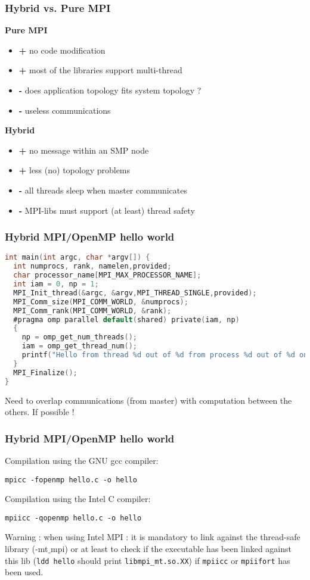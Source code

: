 \begin{frame}[containsverbatim]
	\frametitle{Hybrid vs. Pure MPI}	
\textbf{Pure MPI}
\begin{itemize}
	\item {\textbf{+} no code modification}
	\item {\textbf{+} most of the libraries support multi-thread}
	\item {\textbf{-} does application topology fits system topology ?}
	\item {\textbf{-} useless communications}
\end{itemize}
\textbf{Hybrid}
\begin{itemize}
	\item {\textbf{+} no message within an SMP node}
	\item {\textbf{+} less (no) topology problems}
	\item {\textbf{-} all threads sleep when master communicates}
	\item {\textbf{-} MPI-libs must support (at least) thread safety}
\end{itemize}
\end{frame}


\begin{frame}[containsverbatim]
\frametitle{Hybrid MPI/OpenMP hello world}
\begin{lstlisting}[language=C,frame=lines]
int main(int argc, char *argv[]) {
  int numprocs, rank, namelen,provided;
  char processor_name[MPI_MAX_PROCESSOR_NAME];
  int iam = 0, np = 1;
  MPI_Init_thread(&argc, &argv,MPI_THREAD_SINGLE,provided);
  MPI_Comm_size(MPI_COMM_WORLD, &numprocs);
  MPI_Comm_rank(MPI_COMM_WORLD, &rank);
  #pragma omp parallel default(shared) private(iam, np)
  {
    np = omp_get_num_threads();
    iam = omp_get_thread_num();
    printf("Hello from thread %d out of %d from process %d out of %d on\n",iam, np, rank, numprocs);
  }
  MPI_Finalize();
}
\end{lstlisting}

Need to overlap communications (from master) with computation between the others. If possible !

\end{frame}



\begin{frame}[containsverbatim]
\frametitle{Hybrid MPI/OpenMP hello world}

  Compilation using the GNU gcc compiler:
\begin{verbatim}
mpicc -fopenmp hello.c -o hello
\end{verbatim}
  Compilation using the Intel C compiler:

\begin{verbatim}
mpiicc -qopenmp hello.c -o hello
\end{verbatim}

Warning : when using Intel MPI : it is mandatory to link against the thread-safe library (-mt$\_$mpi) or at least to check if the executable has been linked against this lib (\verb+ldd hello+ should print \verb+libmpi_mt.so.XX+) if \verb+mpiicc+ or \verb+mpiifort+ has been used.

\end{frame}


